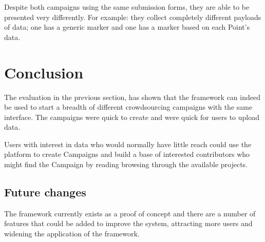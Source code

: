 \documentclass{article}
\newcommand\ssection{\clearpage\section}
\begin{document}
		Despite both campaigns using the same submission forms, they are able to be presented very differently. For example: they collect completely different payloads of data; one has a generic marker and one has a marker based on each Point's data.

	\ssection{Conclusion}
	\label{sec:conclusion}

		The evaluation in the previous section, has shown that the framework can indeed be used to start a breadth of different crowdsourcing campaigns with the same interface. The campaigns were quick to create and were quick for users to upload data.

		Users with interest in data who would normally have little reach could use the platform to create Campaigns and build a base of interested contributors who might find the Campaign by reading browsing through the available projects.

		\subsection{Future changes}

		The framework currently exists as a proof of concept and there are a number of features that could be added to improve the system, attracting more users and widening the application of the framework.
\end{document}

